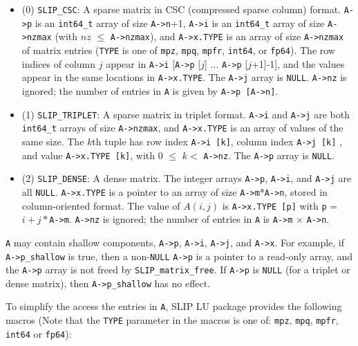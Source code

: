 \documentclass[12pt]{article}
\theoremstyle{definition}
\begin{document}
\begin{itemize}
\item
 (0) \verb|SLIP_CSC|:  A sparse matrix in CSC (compressed sparse column) format.
      \verb|A->p| is an \verb|int64_t| array of size \verb|A->n|+1, \verb|A->i|
      is an \verb|int64_t| array of size \verb|A->nzmax| (with $nz$ $\le$
      \verb|A->nzmax|), and \verb|A->x.TYPE| is an array of size
      \verb|A->nzmax| of matrix entries (\verb'TYPE' is one of \verb|mpz|,
      \verb|mpq|, \verb|mpfr|, \verb|int64|, or \verb|fp64|).  The row indices
      of column $j$ appear in \verb|A->i| [\verb|A->p| [$j$] ... \verb|A->p|
      [$j$+1]-1], and the values appear in the same locations in
      \verb|A->x.TYPE|.  The \verb|A->j| array is \verb|NULL|.  \verb|A->nz| is
      ignored; the number of entries in \verb|A| is given by \verb|A->p [A->n]|.

\item
 (1) \verb|SLIP_TRIPLET|:  A sparse matrix in triplet format.  \verb|A->i| and
     \verb|A->j| are both \verb|int64_t| arrays of size \verb|A->nzmax|, and
     \verb|A->x.TYPE| is an array of values of the same size.  The $k$th tuple
     has row index \verb|A->i [k]|, column index \verb|A->j [k]| , and value
     \verb|A->x.TYPE [k]|, with 0 $\le$ $k <$ \verb|A->nz|.
     The \verb|A->p| array is \verb|NULL|.

\item
 (2) \verb|SLIP_DENSE|:  A dense matrix.  The integer arrays \verb|A->p|,
     \verb|A->i|, and \verb|A->j| are all \verb|NULL|.  \verb|A->x.TYPE| is a
     pointer to an array of size \verb|A->m|*\verb|A->n|, stored in
     column-oriented format.  The value of $A(i,j)$ is \verb|A->x.TYPE [p]|
     with \verb|p| = $i + j*$\verb|A->m|.  \verb|A->nz| is ignored; the number
     of entries in \verb|A| is \verb|A->m| $\times$ \verb|A->n|.

\end{itemize}

\verb|A| may contain shallow components, \verb|A->p|, \verb|A->i|, \verb|A->j|,
and \verb|A->x|.  For example, if \verb|A->p_shallow| is true, then a
non-\verb|NULL| \verb|A->p| is a pointer to a read-only array, and the
\verb|A->p| array is not freed by \verb|SLIP_matrix_free|.  If \verb|A->p| is
\verb|NULL| (for a triplet or dense matrix), then \verb|A->p_shallow| has no
effect.

To simplify the access the entries in \verb|A|, SLIP LU package provides the
following macros (Note that the \verb|TYPE| parameter in the macros is one of:
\verb|mpz|, \verb|mpq|, \verb|mpfr|, \verb|int64| or \verb|fp64|):
\end{document}

